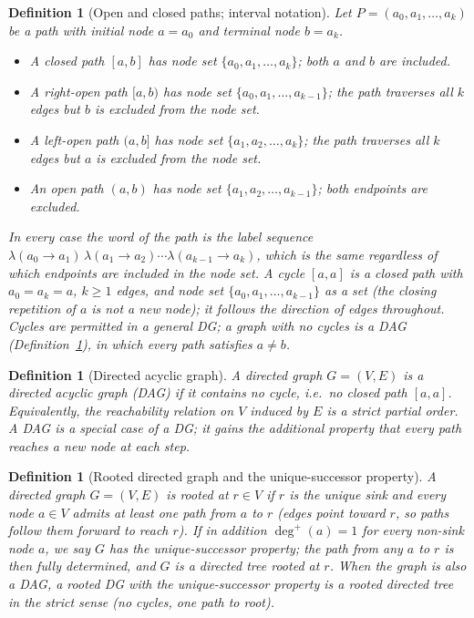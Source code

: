 \documentclass[11pt,a4paper]{article}
\newtheorem{definition}[theorem]{Definition}
\theoremstyle{remark}
\theoremstyle{plain}
\begin{document}
\begin{definition}[Open and closed paths; interval notation]\label{def:openclosed}
Let $P = (a_0, a_1, \ldots, a_k)$ be a path with initial node $a = a_0$ and terminal
node $b = a_k$.
\begin{itemize}
  \item A \emph{closed path} $[a, b]$ has node set $\{a_0, a_1, \ldots, a_k\}$;
        both $a$ and $b$ are included.
  \item A \emph{right-open path} $[a, b)$ has node set $\{a_0, a_1, \ldots, a_{k-1}\}$;
        the path traverses all $k$ edges but $b$ is excluded from the node set.
  \item A \emph{left-open path} $(a, b]$ has node set $\{a_1, a_2, \ldots, a_k\}$;
        the path traverses all $k$ edges but $a$ is excluded from the node set.
  \item An \emph{open path} $(a, b)$ has node set $\{a_1, a_2, \ldots, a_{k-1}\}$;
        both endpoints are excluded.
\end{itemize}
In every case the \emph{word of the path} is the label sequence
$\lambda(a_0 \to a_1)\,\lambda(a_1 \to a_2)\cdots\lambda(a_{k-1} \to a_k)$,
which is the same regardless of which endpoints are included in the node set.
A \emph{cycle} $[a, a]$ is a closed path with $a_0 = a_k = a$, $k \ge 1$ edges,
and node set $\{a_0, a_1, \ldots, a_{k-1}\}$ as a set (the closing repetition of $a$
is not a new node); it follows the direction of edges throughout.
Cycles are permitted in a general DG; a graph with no cycles is a DAG
(Definition~\ref{def:dag}), in which every path satisfies $a \ne b$.
\end{definition}

\begin{definition}[Directed acyclic graph]\label{def:dag}
A directed graph $G = (V, E)$ is a \emph{directed acyclic graph} (\emph{DAG})
if it contains no cycle, i.e.\ no closed path $[a, a]$.
Equivalently, the reachability relation on $V$ induced by $E$ is a strict partial order.
A DAG is a special case of a DG; it gains the additional property that every path
reaches a new node at each step.
\end{definition}

\begin{definition}[Rooted directed graph and the unique-successor property]
A directed graph $G = (V, E)$ is \emph{rooted} at $r \in V$ if $r$ is the unique sink
and every node $a \in V$ admits at least one path from $a$ to $r$
(edges point toward $r$, so paths follow them forward to reach $r$).
If in addition $\deg^+(a) = 1$ for every non-sink node $a$, we say $G$ has the
\emph{unique-successor property}; the path from any $a$ to $r$ is then fully
determined, and $G$ is a \emph{directed tree} rooted at $r$.
When the graph is also a DAG, a rooted DG with the unique-successor property
is a \emph{rooted directed tree} in the strict sense (no cycles, one path to root).
\end{definition}
\end{document}
